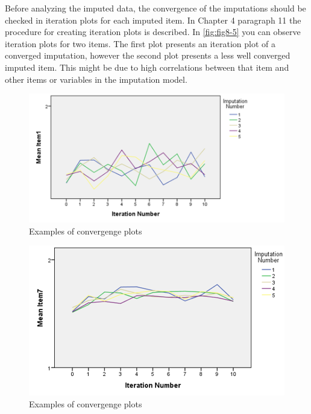 \documentclass[
]{book}
\begin{document}
Before analyzing the imputed data, the convergence of the imputations should be checked in iteration plots for each imputed item. In Chapter 4 paragraph 11 the procedure for creating iteration plots is described. In \ref{fig:fig8-5} you can observe iteration plots for two items. The first plot presents an iteration plot of a converged imputation, however the second plot presents a less well converged imputed item. This might be due to high correlations between that item and other items or variables in the imputation model.

\begin{figure}

{\centering \includegraphics[width=0.9\linewidth]{images/fig8.5a} 

}

\caption{Examples of convergenge plots}\label{fig:fig8-5-1}
\end{figure}
\begin{figure}

{\centering \includegraphics[width=0.9\linewidth]{images/fig8.5b} 

}

\caption{Examples of convergenge plots}\label{fig:fig8-5-2}
\end{figure}
\end{document}
